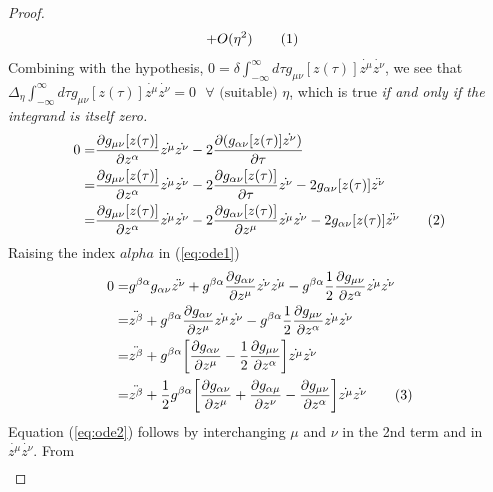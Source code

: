 \documentclass[]{article}
\newcommand\numberthis{\addtocounter{equation}{1}\tag{\theequation}}
\begin{document}
\begin{proof}
\begin{align*}
	+& O(\eta^2) \numberthis \label{eq:delta}
	\end{align*}
	Combining with the hypothesis, $0=\delta \int_{-\infty}^{\infty} d \tau g_{\mu\nu}[z(\tau)] \dot{z^{\mu}} \dot{z^{\nu}}$, we see that $\Delta_{\eta} \int_{-\infty}^{\infty} d \tau g_{\mu\nu}[z(\tau)] \dot{z^{\mu}} \dot{z^{\nu}}=0 \text{ }\forall \text{ (suitable) } \eta$, which is true \emph{if and only if the integrand is itself zero.}
	\begin{align*}
	0=&\frac{\partial g_{\mu\nu}[z(\tau)]}{\partial z^{\alpha}} \dot{z^{\mu}} \dot{z^{\nu}}-2\frac{ \partial (g_{\alpha\nu}[z(\tau)] \dot{z^{\nu}})}{\partial \tau}\\
	=&\frac{\partial g_{\mu\nu}[z(\tau)]}{\partial z^{\alpha}} \dot{z^{\mu}} \dot{z^{\nu}}-2\frac{ \partial g_{\alpha\nu}[z(\tau)] }{\partial \tau}\dot{z^{\nu}}-2g_{\alpha\nu}[z(\tau)] \ddot{z^{\nu}}\\
	=&\frac{\partial g_{\mu\nu}[z(\tau)]}{\partial z^{\alpha}} \dot{z^{\mu}} \dot{z^{\nu}}-2\frac{ \partial g_{\alpha\nu}[z(\tau)] }{\partial z^{\mu}}\dot{z^{\mu}}\dot{z^{\nu}}-2g_{\alpha\nu}[z(\tau)] \ddot{z^{\nu}} \numberthis \label{eq:ode1}
	\end{align*}
	Raising the index $alpha$ in (\ref{eq:ode1})
	\begin{align*}
	0=& g^{\beta\alpha} g_{\alpha\nu}\ddot{z^{\nu}} + g^{\beta\alpha} \frac{\partial g_{\alpha\nu}}{\partial z^{\mu}} \dot{z^\nu} \dot{z^\mu} - g^{\beta\alpha} \frac{1}{2} \frac{\partial g_{\mu\nu}}{\partial z^{\alpha}} \dot{z^{\mu}} \dot{z^{\nu}}\\
	=& \ddot{z^{\beta}} + g^{\beta\alpha} \frac{\partial g_{\alpha\nu}}{\partial z^{\mu}} \dot{z^\mu} \dot{z^\nu} - g^{\beta\alpha} \frac{1}{2} \frac{\partial g_{\mu\nu}}{\partial z^{\alpha}} \dot{z^{\mu}} \dot{z^{\nu}}\\
	=& \ddot{z^{\beta}} + g^{\beta\alpha} \bigg[\frac{\partial g_{\alpha\nu}}{\partial z^{\mu}}-\frac{1}{2} \frac{\partial g_{\mu\nu}}{\partial z^{\alpha}} \bigg]   \dot{z^\mu} \dot{z^\nu} \\
	=& \ddot{z^{\beta}} + \frac{1}{2} g^{\beta\alpha} \bigg[\frac{\partial g_{\alpha\nu}}{\partial z^{\mu}} + \frac{\partial g_{\alpha\mu}}{\partial z^{\nu}} -\frac{\partial g_{\mu\nu}}{\partial z^{\alpha}} \bigg]   \dot{z^\mu} \dot{z^\nu} \numberthis \label{eq:ode2}	
	\end{align*}
	Equation (\ref{eq:ode2}) follows by interchanging $\mu$ and $\nu$ in the 2nd term and in $\dot{z^\mu} \dot{z^\nu}$. From \cite{akhmedev2016}
    \begin{align*}

\end{align*}
\end{proof}
\end{document}
